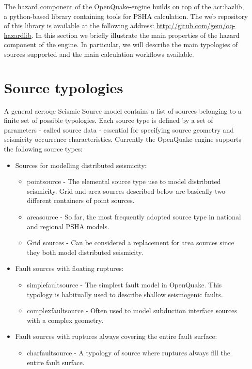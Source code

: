 The hazard component of the OpenQuake-engine builds on top of the 
\gls{acr:hazlib}, a python-based library containing
tools for PSHA calculation. 
%
The web repository of this library is available at the following address: 
\href{http://gitub.com/gem/oq-hazardlib}{http://gitub.com/gem/oq-hazardlib}.
%
In this section we briefly illustrate the main properties of the 
hazard component of the engine. 
%
In particular, we will describe the main typologies of sources supported 
and the main calculation workflows available.
%
\section{Source typologies}
A general \gls{acr:oqe} Seismic Source model contains a list
of sources belonging to a finite set of possible typologies. 
Each source type is defined by a set of parameters - called 
source data - essential for specifying source geometry and 
seismicity occurrence characteristics.
%
Currently the OpenQuake-engine supports the following source types: 
\begin{itemize}
	\item Sources for modelling distributed seismicity:
	\begin{itemize}
		\item \Gls{pointsource} - The elemental source type use to model 
			distributed seismicity. Grid and area sources described below
			are basically two different containers of point sources.
		\item \Gls{areasource} - So far, the most frequently adopted source 
    		type in national and regional PSHA models.
		\item Grid sources - Can be considered a replacement 
    		for area sources since they both model distributed seismicity.
	\end{itemize}
	\item Fault sources with floating ruptures:
	\begin{itemize}
		\item \Gls{simplefaultsource} - The simplest fault model in OpenQuake. 
    		This typology is habitually used to describe shallow seismogenic 
    		faults.
		\item \Gls{complexfaultsource} - Often used to model subduction interface 
			sources with a complex geometry. 
	\end{itemize}
	\item Fault sources with ruptures always covering the entire fault surface:
	\begin{itemize}
		\item \Gls{charfaultsource} - A typology of source where ruptures
		always fill the entire fault surface.
	\end{itemize}
\end{itemize}
